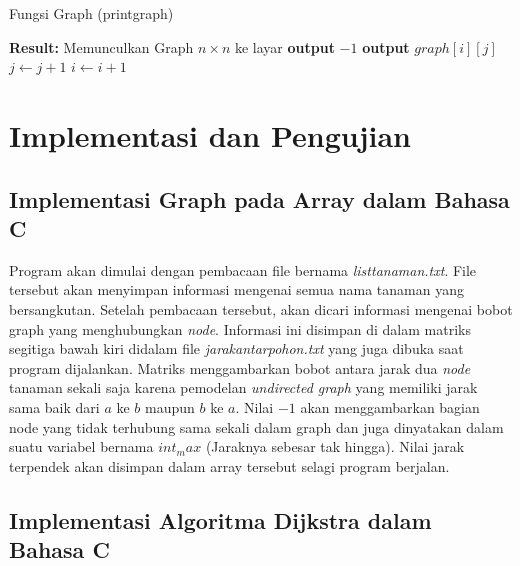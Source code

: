 \documentclass[conference]{IEEEtran}
\begin{document}
\begin{algorithm}[H]
    \caption{Fungsi Graph (printgraph)}\label{alg:printgraph}
\begin{algorithmic}
    \State \textbf{Result:} Memunculkan Graph $n \times n$ ke layar
                \State \textbf{output} $-1$
            \Else
                \State \textbf{output} $graph[i][j]$
            \EndIf
            \State $j \leftarrow j + 1$
        \EndWhile
        \State $i \leftarrow i + 1$
    \EndProcedure
\end{algorithmic}
\end{algorithm}

\section{Implementasi dan Pengujian}

\subsection{Implementasi Graph pada Array dalam Bahasa C}

    Program akan dimulai dengan pembacaan file bernama
    \textit{listtanaman.txt}. File tersebut akan menyimpan informasi mengenai semua nama tanaman yang bersangkutan. Setelah pembacaan tersebut, akan dicari informasi mengenai bobot graph
    yang menghubungkan \textit{node}. Informasi ini disimpan di dalam
    matriks segitiga bawah kiri didalam file \textit{jarakantarpohon.txt}
    yang juga dibuka saat program dijalankan. Matriks menggambarkan bobot antara jarak dua \textit{node} tanaman sekali saja karena
    pemodelan \textit{undirected graph} yang memiliki jarak sama baik
    dari $a$ ke $b$ maupun $b$ ke $a$. Nilai $-1$ akan menggambarkan
    bagian node yang tidak terhubung sama sekali dalam graph 
    dan juga dinyatakan dalam suatu variabel bernama $int_max$
    (Jaraknya sebesar tak hingga). Nilai jarak terpendek akan
    disimpan dalam array tersebut selagi program berjalan.

\subsection{Implementasi Algoritma Dijkstra dalam Bahasa C}
\end{document}
